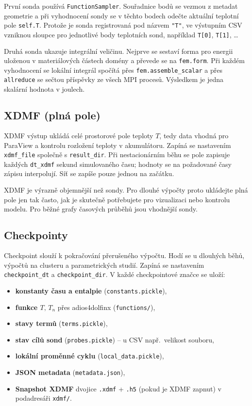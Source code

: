 \documentclass[a4paper,11pt]{article}
\begin{document}
První sonda používá \texttt{FunctionSampler}. Souřadnice bodů se vezmou z
metadat geometrie a při vyhodnocení sondy se v těchto bodech odečte aktuální
teplotní pole \texttt{self.T}. Protože je sonda registrovaná pod názvem
\texttt{"T"}, ve výstupním CSV vzniknou sloupce pro jednotlivé body teplotních
sond, například \texttt{T[0]}, \texttt{T[1]}, \ldots

Druhá sonda ukazuje integrální veličinu. Nejprve se sestaví forma pro energii
uloženou v materiálových částech domény a převede se na \texttt{fem.form}. Při
každém vyhodnocení se lokální integrál spočítá přes \texttt{fem.assemble\_scalar}
a přes \texttt{allreduce} se sečtou příspěvky ze všech MPI procesů. Výsledkem je
jedna skalární hodnota v joulech.

\subsection*{XDMF (plná pole)}

XDMF výstup ukládá celé prostorové pole teploty \(T\), tedy data vhodná pro
ParaView a kontrolu rozložení teploty v akumulátoru. Zapíná se nastavením
\texttt{xdmf\_file} společně s \texttt{result\_dir}. Při nestacionárním běhu se
pole zapisuje každých \texttt{dt\_xdmf} sekund simulovaného času; hodnoty se na
požadované časy zápisu interpolují. Síť se zapíše pouze jednou na začátku.

XDMF je výrazně objemnější než sondy. Pro dlouhé výpočty proto ukládejte plná
pole jen tak často, jak je skutečně potřebujete pro vizualizaci nebo kontrolu
modelu. Pro běžné grafy časových průběhů jsou vhodnější sondy.

\subsection*{Checkpointy}

Checkpoint slouží k pokračování přerušeného výpočtu. Hodí se u dlouhých běhů,
výpočtů na clusteru a parametrických studií. Zapíná se nastavením
\texttt{checkpoint\_dt} a \texttt{checkpoint\_dir}. V každé checkpointové značce
se uloží:

\begin{itemize}
  \item \textbf{konstanty času a entalpie} (\texttt{constants.pickle}),
  \item \textbf{funkce \(T,\,T_n\)} přes adios4dolfinx (\texttt{functions/}),
  \item \textbf{stavy termů} (\texttt{terms.pickle}),
  \item \textbf{stav cílů sond} (\texttt{probes.pickle}) -- u CSV např.\ velikost souboru,
  \item \textbf{lokální proměnné cyklu} (\texttt{local\_data.pickle}),
  \item \textbf{JSON metadata} (\texttt{metadata.json}),
  \item \textbf{Snapshot XDMF} dvojice \texttt{.xdmf} + \texttt{.h5}
        (pokud je XDMF zapnut) v podadresáři \texttt{xdmf/}.
\end{itemize}
\end{document}
